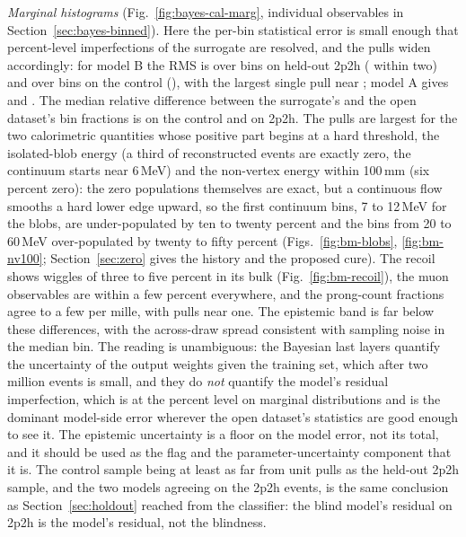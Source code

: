 \documentclass[11pt]{article}
\begin{document}
\emph{Marginal histograms} (Fig.~\ref{fig:bayes-cal-marg}, individual observables in
Section~\ref{sec:bayes-binned}). Here the per-bin statistical error is small enough that percent-level
imperfections of the surrogate are resolved, and the pulls widen accordingly: for model B the RMS is
\nBayBOODMargPullRMS{} over \nBayBOODMargBins{} bins on held-out 2p2h (\nBayBOODMargWithin{} within two) and
\nBayBCtlMargPullRMS{} over \nBayBCtlMargBins{} bins on the control (\nBayBCtlMargWithin{}), with the largest
single pull near \nBayBCtlMargMaxPull{}; model A gives \nBayAOODMargPullRMS{} and \nBayACtlMargPullRMS{}. The
median relative difference between the surrogate's and the open dataset's bin fractions is
\nBayBCtlMargRelDiffMedian{} on the control and \nBayBOODMargRelDiffMedian{} on 2p2h. The pulls are largest for the
two calorimetric quantities whose positive part begins at a hard threshold, the isolated-blob energy (a third of
reconstructed events are exactly zero, the continuum starts near 6\,MeV) and the non-vertex energy within
100\,mm (six percent zero): the zero populations themselves are exact, but a continuous flow smooths a hard lower
edge upward, so the first continuum bins, 7 to 12\,MeV for the blobs, are under-populated by ten to twenty
percent and the bins from 20 to 60\,MeV over-populated by twenty to fifty percent (Figs.~\ref{fig:bm-blobs},
\ref{fig:bm-nv100}; Section~\ref{sec:zero} gives the history and the proposed cure). The recoil shows wiggles of
three to five percent in its bulk (Fig.~\ref{fig:bm-recoil}), the muon observables are within a few percent
everywhere, and the prong-count fractions agree to a few per mille, with pulls near one.
The epistemic band is far below these differences, with the across-draw spread consistent with sampling noise in
the median bin. The reading is unambiguous: the
Bayesian last layers quantify the uncertainty of the output weights given the training set, which after two
million events is small, and they do \emph{not} quantify the model's residual imperfection, which is at the
percent level on marginal distributions and is the dominant model-side error wherever the open dataset's
statistics are good enough to see it. The epistemic uncertainty is a floor on the model error, not its total,
and it should be used as the flag and the parameter-uncertainty component that it is. The control sample being
at least as far from unit pulls as the held-out 2p2h sample, and the two models agreeing on the 2p2h events, is
the same conclusion as Section~\ref{sec:holdout} reached from the classifier: the blind model's residual on 2p2h
is the model's residual, not the blindness.
\end{document}
